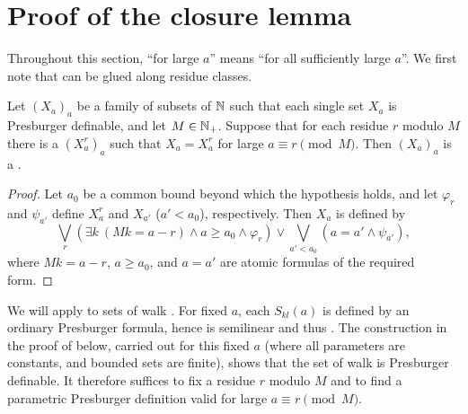 \section{Proof of the closure lemma}\label{section: appendix: closure}

Throughout this section, ``for large $a$'' means ``for all sufficiently large $a$''.
We first note that  can be glued along residue classes.
\begin{lemma}\label{lemma: glue}
    Let $(X_a)_{a}$ be a family of subsets of $\mathbb{N}$ such that each single set $X_a$ is Presburger definable, and let $M \in \mathbb{N}_{+}$.
    Suppose that for each residue $r$ modulo $M$ there is a  $(X^{r}_a)_a$ such that $X_a = X^{r}_{a}$ for large $a \equiv r \pmod M$.
    Then $(X_a)_a$ is a .
\end{lemma}
\begin{proof}
    Let $a_0$ be a common bound beyond which the hypothesis holds, and let $\varphi_r$ and $\psi_{a'}$ define $X^{r}_a$ and $X_{a'}$ ($a' < a_0$), respectively.
    Then $X_a$ is defined by
    \[\textstyle\bigvee_{r} \left(\exists k\ (M k = a - r) \land a \ge a_0 \land \varphi_r\right) \lor \bigvee_{a' < a_0} \left(a = a' \land \psi_{a'}\right),\]
    where $M k = a - r$, $a \ge a_0$, and $a = a'$ are atomic formulas of the required form.
\end{proof}
We will apply  to sets of walk .
For fixed $a$, each $S_{kl}(a)$ is defined by an ordinary Presburger formula, hence is semilinear and thus .
The construction in the proof of  below, carried out for this fixed $a$ (where all parameters are constants, and bounded sets are finite), shows that the set of walk  is Presburger definable.
It therefore suffices to fix a residue $r$ modulo $M$ and to find a parametric Presburger definition valid for large $a \equiv r \pmod M$.

